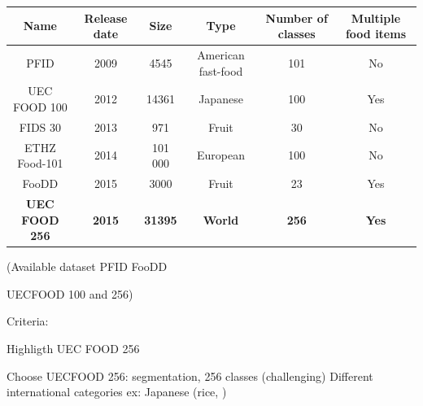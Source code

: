 \documentclass[aspectratio=169]{beamer}
\newenvironment{myframe}[1][t]{\begin{frame}[#1]{\secname}{\subsecname}}{\end{frame}}
\begin{document}
     \begin{myframe}
         \begin{center}
             \renewcommand{\arraystretch}{1.3} %
             \begin{tabulary}{\textwidth}{|| c | C c C C C||}
                 \hline
                 Name & Release date & Size & Type & Number of classes & Multiple food items \\
                 \hline\hline
                 PFID \cite{Chen2009} & 2009 & 4545 & American fast-food  & 101 & No \\
                 \hline
                 UEC FOOD 100 \cite{Matsuda2012a} & 2012 & 14361 & Japanese & 100  & Yes \\
                 \hline
                 FIDS 30 \cite{FIDS30} & 2013 & 971 & Fruit & 30 & No \\
                 \hline
                 ETHZ Food-101 \cite{Bossard2014} & 2014 & 101 000 & European & 100 & No \\
                 \hline
                 FooDD \cite{ParisaPouladzadehAbdulsalamYassine2015} & 2015 & 3000 & Fruit & 23 & Yes \\
                 \hline
                 \textbf{UEC FOOD 256} \cite{Kawano2015} & \textbf{2015} & \textbf{31395} & \textbf{World} & \textbf{256}  & \textbf{Yes} \\ 
                 \hline
             \end{tabulary}
        \end{center}
         
         (Available dataset
         PFID
         FooDD
         
         UECFOOD 100 and 256)
         
         Criteria: 
         
         Highligth UEC FOOD 256
         
         Choose UECFOOD 256: segmentation, 256 classes (challenging)
         Different international categories ex: Japanese (rice, )
    \end{myframe}
    
\end{document}
